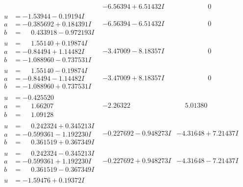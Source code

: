 \documentclass[1p]{elsarticle_modified}
\theoremstyle{definition}
\begin{document}
$$\begin{array}{c|c|c}
 & -6.56394 + 6.51432 I & \phantom{-0.000000 } 0 \\ \hline\begin{aligned}
u &= -1.53944 - 0.19194 I \\
a &= -0.385692 + 0.184391 I \\
b &= \phantom{-}0.433918 - 0.972193 I\end{aligned}
 & -6.56394 - 6.51432 I & \phantom{-0.000000 } 0 \\ \hline\begin{aligned}
u &= \phantom{-}1.55140 + 0.19874 I \\
a &= -0.84494 + 1.14482 I \\
b &= -1.088960 - 0.737531 I\end{aligned}
 & -3.47009 - 8.18357 I & \phantom{-0.000000 } 0 \\ \hline\begin{aligned}
u &= \phantom{-}1.55140 - 0.19874 I \\
a &= -0.84494 - 1.14482 I \\
b &= -1.088960 + 0.737531 I\end{aligned}
 & -3.47009 + 8.18357 I & \phantom{-0.000000 } 0 \\ \hline\begin{aligned}
u &= -0.425520\phantom{ +0.000000I} \\
a &= \phantom{-}1.66207\phantom{ +0.000000I} \\
b &= \phantom{-}1.09128\phantom{ +0.000000I}\end{aligned}
 & -2.26322\phantom{ +0.000000I} & \phantom{-}5.01380\phantom{ +0.000000I} \\ \hline\begin{aligned}
u &= \phantom{-}0.242324 + 0.345213 I \\
a &= -0.599361 - 1.192230 I \\
b &= \phantom{-}0.361519 + 0.367349 I\end{aligned}
 & -0.227692 - 0.948273 I & -4.31648 + 7.21437 I \\ \hline\begin{aligned}
u &= \phantom{-}0.242324 - 0.345213 I \\
a &= -0.599361 + 1.192230 I \\
b &= \phantom{-}0.361519 - 0.367349 I\end{aligned}
 & -0.227692 + 0.948273 I & -4.31648 - 7.21437 I \\ \hline\begin{aligned}
u &= -1.59476 + 0.19372 I \\

\end{aligned}
\end{array}$$
\end{document}
